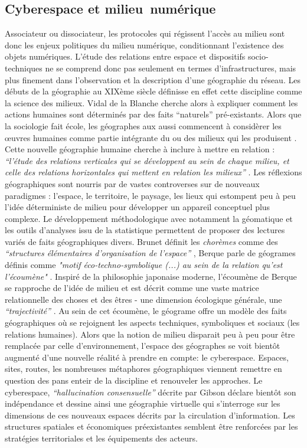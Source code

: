 \subsection[Cyberespace et milieu numérique]{Cyberespace et milieu numérique}
Associateur ou dissociateur, les protocoles qui régissent l’accès au milieu sont donc les enjeux politiques du milieu numérique, conditionnant l’existence des objets numériques. L’étude des relations entre espace et dispositifs socio-techniques ne se comprend donc pas seulement en termes d’infrastructures, mais plus finement dans l’observation et la description d’une géographie du réseau. Les débuts de la géographie au XIXème siècle définisse en effet cette discipline comme la science des milieux. Vidal de la Blanche cherche alors à expliquer comment les actions humaines sont déterminés par des faits “naturels” pré-existants. Alors que la sociologie fait école, les géographes aux aussi commencent à considèrer les œuvres humaines comme partie intégrante du ou des milieux qui les produisent \citep{Demangeot1984}. Cette nouvelle géographie humaine cherche à inclure à mettre en relation : \textit{“l'étude des relations verticales qui se développent au sein de chaque milieu, et celle des relations horizontales qui mettent en relation les milieux”} \citep{Claval1990}. Les réflexions géographiques sont nourris par de vastes controverses sur de nouveaux paradigmes : l'espace, le territoire, le paysage, les lieux qui estompent peu à peu l’idée déterministe de milieu pour développer un appareil conceptuel plus complexe. Le développement méthodologique avec notamment la géomatique et les outils d’analyses issu de la statistique permettent de proposer des lectures variés de faits géographiques divers. Brunet définit les \textit{chorèmes} comme des \textit{“structures élémentaires d'organisation de l'espace”} \citep{Brunet1980}, Berque parle de géogrames définis comme \textit{"motif éco-techno-symbolique (...) au sein de la relation qu'est l'écoumène"} \citep{Berque1999}. Inspiré de la philosophie japonaise moderne, l’écoumène de Berque se rapproche de l’idée de milieu et est décrit comme une vaste matrice relationnelle des choses et des êtres - une dimension écologique générale, une \textit{“trajectivité”} \citep{Watsuji2011}. Au sein de cet écoumène, le géograme offre un modèle des faits géographiques où se rejoignent les aspects techniques, symboliques et sociaux (les relations humaines). Alors que la notion de milieu disparait peu à peu pour être remplacée par celle d’environnement\citep{DAngio2001}, l’espace des géographes se voit bientôt augmenté d’une nouvelle réalité à prendre en compte: le cyberespace. Espaces, sites, routes, les nombreuses métaphores géographiques viennent remettre en question des pans enteir de la discipline et renouveler les approches. Le cyberespace, \textit{“hallucination consensuelle”} décrite par Gibson \citep{Gibson1984} déclare bientôt son indépendance \citep{Barlow2001} et dessine ainsi une géographie virtuelle \citep{Batty1997} qui s’interroge sur les dimensions de ces nouveaux espaces décrits par la circulation d’information. Les structures spatiales et économiques préexistantes semblent être renforcées par les stratégies territoriales et les équipements des acteurs. 